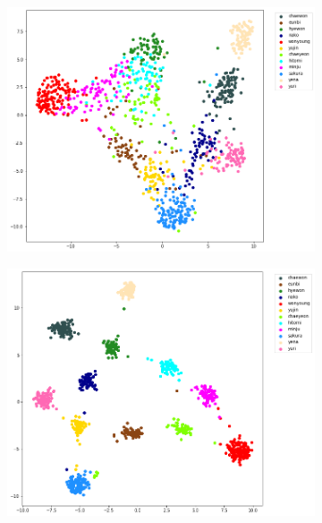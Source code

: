 \begin{enumerate}[left=0pt]
\begin{figure}[htbp]
    \centering
    \begin{subfigure}{0.325\textwidth}
        \centering
        \includegraphics[trim=37 20 100 0, clip, width=\textwidth]{images/faceReco/nn2-and-triplet/tsne-1.png}     
    \end{subfigure}
    \hfill
    \begin{subfigure}{0.325\textwidth}
        \centering
        \includegraphics[trim=30 20 100 0, clip, width=\textwidth]{images/faceReco/nn2-and-triplet/tsne-2.png}     
    \end{subfigure}

\end{figure}
\end{enumerate}
